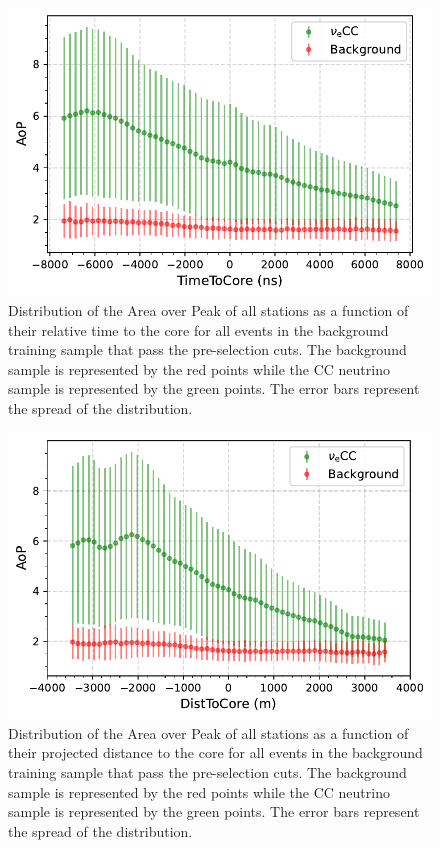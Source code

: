 \begin{figure}[h!]
  \centering
  \includegraphics[width=\textwidth]{thesis_figures/Nu_analysis/Selection_Evo_AoP_Time_mean_CC_redcut.pdf}
  \caption{Distribution of the Area over Peak of all stations as a function of their relative time to the core for all events in the background training sample that pass the pre-selection cuts. The background sample is represented by the red points while the CC neutrino sample is represented by the green points. The error bars represent the spread of the distribution.}
  \label{fig:Time_to_core}
\end{figure}

\begin{figure}[h!]
  \centering
  \includegraphics[width=\textwidth]{thesis_figures/Nu_analysis/Selection_Evo_AoP_Dist_mean_CC_redcut.pdf}
  \caption{Distribution of the Area over Peak of all stations as a function of their projected distance to the core for all events in the background training sample that pass the pre-selection cuts. The background sample is represented by the red points while the CC neutrino sample is represented by the green points. The error bars represent the spread of the distribution.}
  \label{fig:Dist_to_core}
\end{figure}

